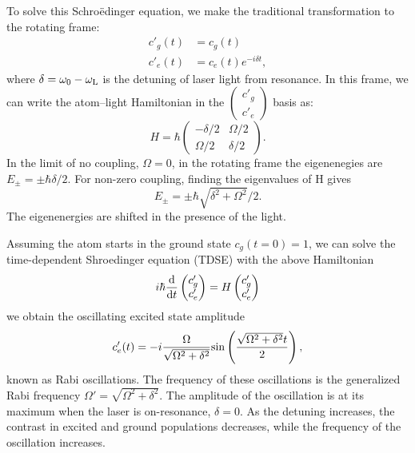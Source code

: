 To solve this Schro\"edinger equation, we make the traditional transformation to the rotating frame:
\begin{align}
c'_g(t) & = c_g(t)\\
c'_e(t) & = c_e(t) e^{-i\delta t}, 
\end{align}
where $\delta = \omega_0 - \omega_{\rm L}$ is the detuning of laser light from resonance. In this frame, we can write the atom--light Hamiltonian in the $\begin{pmatrix} c'_g \\ c'_e \end{pmatrix}$ basis as:
\begin{equation}
H = \hbar \begin{pmatrix} -\delta/2 & \Omega/2 \\ \Omega/2 & \delta/2 \end{pmatrix}.
\label{eqn:TwoLevelHam}
\end{equation}
In the limit of no coupling, $\Omega = 0$, in the rotating frame the eigenenegies are $E_{\pm} = \pm \hbar \delta/2$. For non-zero coupling, finding the eigenvalues of H gives 
\begin{equation}
E_{\pm} = \pm \hbar \sqrt{\delta^2 + \Omega^2}/2.
\label{eqn:TwoLevelEnergy}
\end{equation}
The eigenenergies are shifted in the presence of the light. 

Assuming the atom starts in the ground state $c_g(t=0)=1$, we can solve the time-dependent Shroedinger equation (TDSE) with the above Hamiltonian
\begin{equation}
i\hbar \frac{{\rm d}}{{\rm d}t} \begin{pmatrix} c'_g \\ c'_e \end{pmatrix} = H \begin{pmatrix} c'_g \\ c'_e \end{pmatrix}
\end{equation}
we obtain the oscillating excited state amplitude 
\begin{equation}
c'_e(t) = -i \frac{\Omega}{\sqrt{\Omega^2 + \delta^2}}{\rm sin}\left(\frac{\sqrt{\Omega^2 + \delta^2}t}{2}\right),
\label{eq:Rabi}
\end{equation} 
known as Rabi oscillations. The frequency of these oscillations is the generalized Rabi frequency $\Omega'=\sqrt{\Omega^2 + \delta^2}$. The amplitude of the oscillation is at its maximum when the laser is on-resonance, $\delta=0$. As the detuning increases, the contrast in excited and ground populations decreases, while the frequency of the oscillation increases. 

